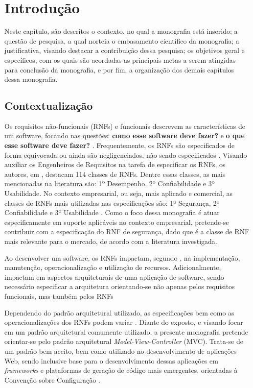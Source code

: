 \chapter{Introdução}
\label{chap:introducao}

Neste capítulo, são descritos o contexto, no qual a monografia está inserido; a questão de pesquisa, a qual norteia o embasamento científico da monografia;  a justificativa, visando destacar a contribuição dessa pesquisa; os objetivos geral e específicos, com os quais são acordadas as principais metas a serem atingidas para conclusão da monografia, e por fim, a organização dos demais capítulos dessa monografia.

\section{Contextualização}

Os requisitos não-funcionais (RNFs) e funcionais descrevem as características de um software, focando nas questões: \textbf{como esse software deve fazer?} e \textbf{o que esse software deve fazer?}  \cite{sommerville1997requirements}. Frequentemente, os RNFs são especificados de forma equivocada ou ainda são negligenciados, não sendo especificados \cite{eckhardt2016non}. Visando auxiliar os Engenheiros de Requisitos na tarefa de especificar os RNFs, os autores, em \cite{mairiza2010investigation}, destacam 114 classes de RNFs. Dentre essas classes, as mais mencionadas na literatura são: 1º Desempenho, 2º Confiabilidade e  3º Usabilidade. No contexto empresarial, ou seja, mais aplicado e comercial, as classes de RNFs mais utilizadas nas especificações são: 1º Segurança, 2º Confiabilidade e 3º Usabilidade \cite{eckhardt2016non}. Como o foco dessa monografia é atuar especificamente em suporte aplicáveis no contexto empresarial, pretende-se contribuir com a especificação do RNF de segurança, dado que é a classe de RNF mais relevante para o mercado, de acordo com a literatura investigada.

Ao desenvolver um software, os RNFs impactam, segundo \cite{eckhardt2016non}, na implementação, manutenção, operacionalização e utilização de recursos. Adicionalmente, impactam em aspectos arquiteturais de uma aplicação de software, sendo necessário especificar a arquitetura orientando-se não apenas pelos requisitos funcionais, mas também pelos RNFs \cite{buschmann1996system}

Dependendo do padrão arquitetural utilizado, as especificações bem como as operacionalizações dos RNFs podem variar \cite{chung2012non}. Diante do exposto, e visando focar em um padrão arquitetural comumente utilizado, a presente monografia pretende orientar-se pelo padrão arquitetural \textit{Model-View-Controller} (MVC). Trata-se de um padrão bem aceito, bem como utilizado no desenvolvimento de aplicações Web, sendo inclusive base para o desenvolvimento dessas aplicações em \textit{frameworks} e plataformas de geração de código mais emergentes, orientadas à Convenção sobre Configuração \cite{jailia2016behavior}.


